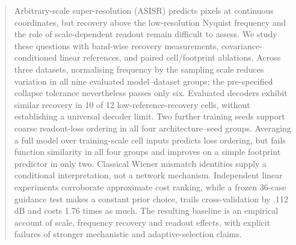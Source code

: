 \begin{abstract}
Arbitrary-scale super-resolution (ASISR) predicts pixels at continuous coordinates, but recovery above the low-resolution Nyquist frequency and the role of scale-dependent readout remain difficult to assess. We study these questions with band-wise recovery measurements, covariance-conditioned linear references, and paired cell/footprint ablations. Across three datasets, normalising frequency by the sampling scale reduces variation in all nine evaluated model--dataset groups; the pre-specified collapse tolerance nevertheless passes only six. Evaluated decoders exhibit similar recovery in 10 of 12 low-reference-recovery cells, without establishing a universal decoder limit. Two further training seeds support coarse readout-loss ordering in all four architecture--seed groups. Averaging a full model over training-scale cell inputs predicts loss ordering, but fails function similarity in all four groups and improves on a simple footprint predictor in only two. Classical Wiener mismatch identities supply a conditional interpretation, not a network mechanism. Independent linear experiments corroborate approximate cost ranking, while a frozen 36-case guidance test makes a constant prior choice, trails cross-validation by .112 dB and costs 1.76 times as much. The resulting baseline is an empirical account of scale, frequency recovery and readout effects, with explicit failures of stronger mechanistic and adaptive-selection claims.
\end{abstract}
